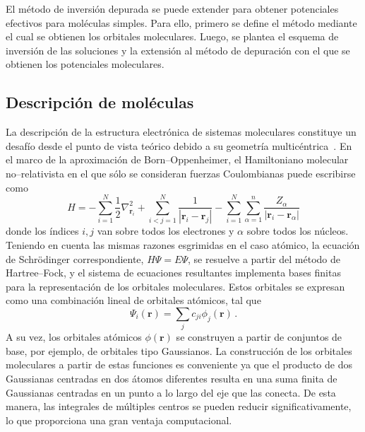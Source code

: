 El método de inversión depurada se puede extender para obtener 
potenciales efectivos para moléculas simples. Para ello, primero se 
define el método mediante el cual se obtienen los orbitales moleculares.
Luego, se plantea el esquema de inversión de las soluciones y la 
extensión al método de depuración con el que se obtienen los potenciales 
moleculares. 

\subsection{Descripción de moléculas}
\label{sec:moleculas}

La descripción de la estructura electrónica de sistemas moleculares 
constituye un desafío desde el punto de vista teórico debido a su 
geometría multicéntrica~\cite{Helgaker:00,Schaefer:04}. 
En el marco de la aproximación de Born--Oppenheimer, el Hamiltoniano 
molecular no--relativista en el que sólo se consideran fuerzas 
Coulombianas puede escribirse como
\begin{equation}
H=-\sum_{i=1}^N \frac{1}{2} \nabla^2_{\mathbf{r}_i} 
  +\sum_{i<j=1}^N \frac{1}{\left|\mathbf{r}_i-\mathbf{r}_j\right|} 
  -\sum_{i=1}^N \sum_{\alpha=1}^n \frac{Z_{\alpha}}{
    \left|\mathbf{r}_i-\mathbf{r}_{\alpha}\right|} 
\label{eq:BOhamiltonian}
\end{equation}
donde los índices $i,j$ van sobre todos los electrones y $\alpha$ 
sobre todos los núcleos. 
Teniendo en cuenta las mismas razones esgrimidas en el caso atómico, la 
ecuación de Schr\"odinger correspondiente, $H\Psi=E\Psi$, se resuelve a 
partir del método de Hartree--Fock, y el sistema de ecuaciones 
resultantes implementa bases finitas para la representación de los 
orbitales moleculares. Estos orbitales se expresan como una combinación 
lineal de orbitales atómicos, 
tal que
\begin{equation}
\Psi_i(\mathbf{r})=\sum_j c_{ji} \phi_j(\mathbf{r})\,.
\end{equation}
A su vez, los orbitales atómicos $\phi(\mathbf{r})$ se construyen a 
partir de conjuntos de base, por ejemplo, de orbitales tipo Gaussianos. 
La construcción de los orbitales moleculares a partir de estas funciones 
es conveniente ya que el producto de dos Gaussianas centradas en dos 
átomos diferentes resulta en una suma finita de Gaussianas centradas en 
un punto a lo largo del eje que las conecta. De esta manera, las 
integrales de múltiples centros se pueden reducir significativamente, lo 
que proporciona una gran ventaja computacional.

